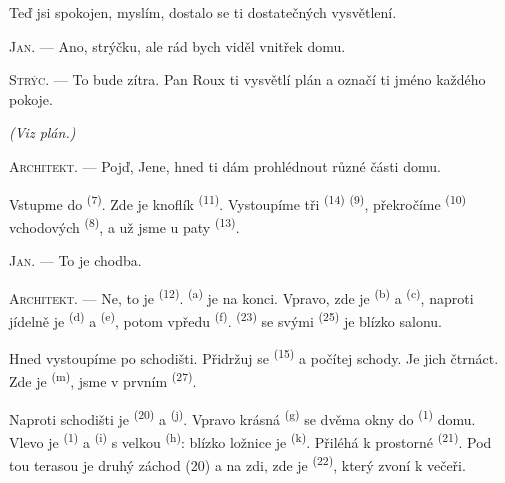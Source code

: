 Teď jsi spokojen, myslím, dostalo se ti dostatečných vysvětlení.

\textsc{Jan}. --- Ano, strýčku, ale rád bych viděl vnitřek domu.

\textsc{Strýc}. --- To bude zítra. Pan Roux ti vysvětlí plán a označí ti jméno každého pokoje.

\VUsaut{3.0mm}
\VUsaut{2.4mm}

{\centering\textit{(Viz plán.)}\par}
\VUsaut{2.4mm}

\textsc{Architekt}. --- Pojď, Jene, hned ti dám prohlédnout různé části domu.

Vstupme do  \textsuperscript{(7)}. Zde je knoflík 
\textsuperscript{(11)}. Vystoupíme tři  \textsuperscript{(14)}
 \textsuperscript{(9)}, překročíme 
\textsuperscript{(10)} vchodových  \textsuperscript{(8)}, a už jsme u paty
 \textsuperscript{(13)}.

\textsc{Jan}. --- To je chodba.

\textsc{Architekt}. --- Ne, to je  \textsuperscript{(12)}.
 \textsuperscript{(a)} je na konci. Vpravo, zde je 
\textsuperscript{(b)} a  \textsuperscript{(c)}, naproti jídelně je
 \textsuperscript{(d)} a 
\textsuperscript{(e)}, potom vpředu  \textsuperscript{(f)}.
 \textsuperscript{(23)} se svými 
\textsuperscript{(25)} je blízko salonu.

Hned vystoupíme po schodišti. Přidržuj se  \textsuperscript{(15)} a počítej
schody. Je jich čtrnáct. Zde je  \textsuperscript{(m)}, jsme v prvním
 \textsuperscript{(27)}.

\VUsaut{3.0mm}
\VUsaut{3.0mm}

Naproti schodišti je  \textsuperscript{(20)} a 
\textsuperscript{(j)}. Vpravo krásná  \textsuperscript{(g)} se dvěma okny do
 \textsuperscript{(1)} domu. Vlevo je  \textsuperscript{(1)}
a  \textsuperscript{(i)} s velkou
 \textsuperscript{(h)}: blízko ložnice je 
\textsuperscript{(k)}. Přiléhá k prostorné  \textsuperscript{(21)}. Pod tou
terasou je druhý záchod (20) a na zdi, zde je  \textsuperscript{(22)}, který
zvoní k večeři.

